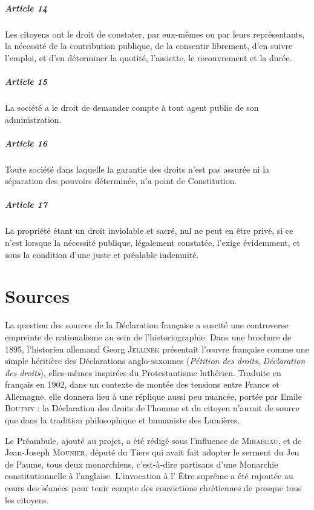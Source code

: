 \documentclass{book}
\begin{document}
\paragraph{Article 14}
Les citoyens ont le droit de constater, par eux-mêmes ou par leurs représentants, la nécessité de la contribution publique, de la consentir librement, d'en suivre l'emploi, et d'en déterminer la quotité, l'assiette, le recouvrement et la durée.
\paragraph{Article 15}
La société a le droit de demander compte à tout agent public de son administration.
\paragraph{Article 16}
Toute société dans laquelle la garantie des droits n'est pas assurée ni la séparation des pouvoirs déterminée, n'a point de Constitution.
\paragraph{Article 17}
La propriété étant un droit inviolable et sacré, nul ne peut en être privé, si ce n'est lorsque la nécessité publique, légalement constatée, l'exige évidemment, et sous la condition d'une juste et préalable indemnité.


\chapter{Sources}

La question des sources de la Déclaration française a suscité une controverse empreinte de nationalisme au sein de l’historiographie. Dans une brochure de 1895, l’historien allemand Georg \textsc{Jellinek} présentait l’\oe uvre française comme une simple héritière des Déclarations anglo-saxonnes (\emph{Pétition des droits}, \emph{Déclaration des droits}), elles-mêmes inspirées du Protestantisme luthérien. Traduite en français en 1902, dans un contexte de montée des tensions entre France et Allemagne, elle donnera lieu à une réplique aussi peu nuancée, portée par Emile \textsc{Boutmy} : la Déclaration des droits de l’homme et du citoyen n’aurait de source que dans la tradition philosophique et humaniste des Lumières.

Le Préambule, ajouté au projet, a été rédigé sous l’influence de \textsc{Mirabeau}, et de Jean-Joseph \textsc{Mounier}, député du Tiers qui avait fait adopter le serment du Jeu de Paume, tous deux monarchiens, c’est-à-dire partisans d’une Monarchie constitutionnelle à l’anglaise.
L’invocation à l’ \og Être suprême \fg a été rajoutée au cours des séances pour tenir compte des convictions chrétiennes de presque tous les citoyens.
\end{document}

